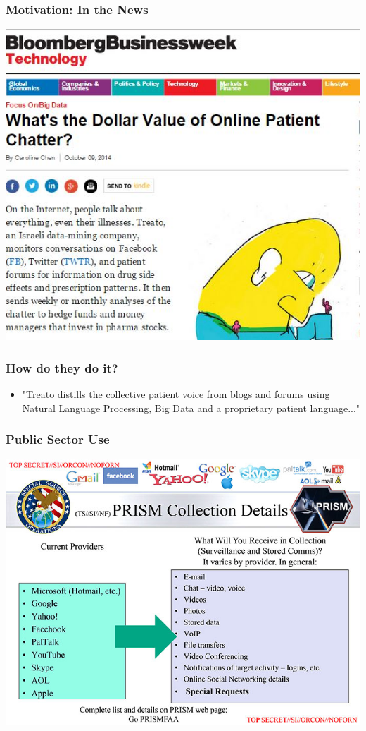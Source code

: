 \documentclass[presentation]{beamer}
\begin{document}
\begin{frame}
\frametitle{Motivation: In the News}
\pause
\begin{center}
\includegraphics[height=.8\textheight]{Images/Treato.jpg}
\end{center}
\end{frame}

\begin{frame}
\frametitle{How do they do it?}
\begin{itemize}
\pause
\item  "Treato distills the collective patient voice from blogs and forums using Natural Language Processing, Big Data and a proprietary patient language..."
\end{itemize}
\end{frame}


\begin{frame}
\frametitle{Public Sector Use}
\pause
\begin{center}
\includegraphics[height=.8\textheight]{Images/PRISM.jpg}
\end{center}
\end{frame}
\end{document}

